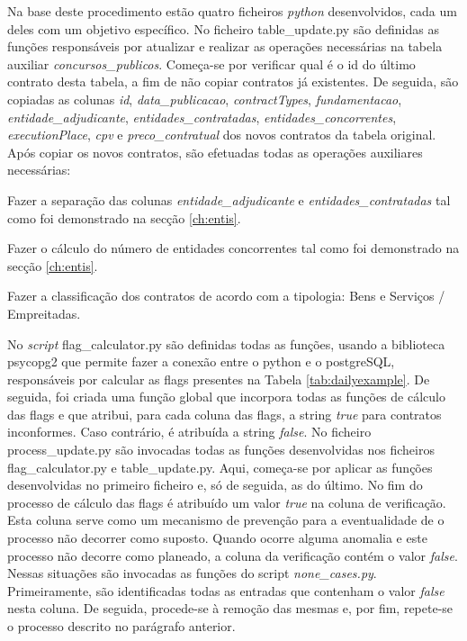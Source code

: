 Na base deste procedimento estão quatro ficheiros \textit{python} desenvolvidos, cada um deles com um objetivo específico. No ficheiro table\_update.py são definidas as funções responsáveis por atualizar e realizar as operações necessárias na tabela auxiliar \textit{concursos\_publicos}. Começa-se por verificar qual é o id do último contrato desta tabela, a fim de não copiar contratos já existentes. De seguida, são copiadas as colunas \textit{id}, \textit{data\_publicacao}, 	\textit{contractTypes}, \textit{fundamentacao}, \textit{entidade\_adjudicante}, \textit{entidades\_contratadas}, \textit{entidades\_concorrentes}, \textit{executionPlace}, \textit{cpv} e \textit{preco\_contratual} dos novos contratos da tabela original. Após copiar os novos contratos, são efetuadas todas as operações auxiliares necessárias:

\begin{my_enumerate}
	
	\item Fazer a separação das colunas \textit{entidade\_adjudicante} e \textit{entidades\_contratadas} tal como foi demonstrado na secção \ref{ch:entis}.
	
	\item Fazer o cálculo do número de entidades concorrentes tal como foi demonstrado na secção \ref{ch:entis}.
	
	\item Fazer a classificação dos contratos de acordo com a tipologia: Bens e Serviços / Empreitadas.
			
\end{my_enumerate}



No \textit{script} flag\_calculator.py são definidas todas as funções, usando a biblioteca psycopg2 que permite fazer a conexão entre o python e o postgreSQL, responsáveis por calcular as flags presentes na Tabela \ref{tab:dailyexample}. De seguida, foi criada uma função global que incorpora todas as funções de cálculo das flags e que atribui, para cada coluna das flags, a string \textit{true} para contratos inconformes. Caso contrário, é atribuída a string \textit{false}. No ficheiro process\_update.py são invocadas todas as funções desenvolvidas nos ficheiros flag\_calculator.py e table\_update.py. Aqui, começa-se por aplicar as funções desenvolvidas no primeiro ficheiro e, só de seguida, as do último. No fim do processo de cálculo das flags é atribuído um valor \textit{true} na coluna de verificação. Esta coluna serve como um mecanismo de prevenção para a eventualidade de o processo não decorrer como suposto. Quando ocorre alguma anomalia e este processo não decorre como planeado, a coluna da verificação contém o valor \textit{false}. Nessas situações são invocadas as funções do script \textit{none\_cases.py}. Primeiramente, são identificadas todas as entradas que contenham o valor \textit{false} nesta coluna. De seguida, procede-se à remoção das mesmas e, por fim, repete-se o processo descrito no parágrafo anterior.

